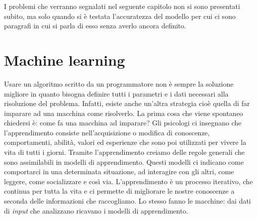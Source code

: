 I problemi che verranno segnalati nel seguente capitolo non si sono presentati subito, ma solo quando si è testata l'accuratezza del modello per cui ci sono paragrafi in cui si parla di esso senza averlo ancora definito.
\section{Machine learning}
Usare un algoritmo scritto da un programmatore non è sempre la soluzione migliore in quanto bisogna definire tutti i parametri e i dati necessari alla risoluzione del problema. Infatti, esiste anche un'altra strategia cioè quella di far imparare ad una macchina come risolverlo. La prima cosa che viene spontaneo chiedersi è: come fa una macchina ad imparare? Gli psicologi ci insegnano che l’apprendimento consiste nell’acquisizione o modifica di conoscenze, comportamenti, abilità, valori ed esperienze che sono poi utilizzati per vivere la vita di tutti i giorni. Tramite l’apprendimento creiamo delle regole generali che sono assimilabili in modelli di apprendimento. Questi modelli ci indicano come comportarci in una determinata situazione, ad interagire con gli altri, come leggere, come socializzare e così via. L’apprendimento è un processo iterativo, che continua per tutta la vita e ci permette di migliorare le nostre conoscenze a seconda delle informazioni che raccogliamo. Lo stesso fanno le macchine: dai dati di \textit{input} che analizzano ricavano i modelli di apprendimento.\\
\newline
